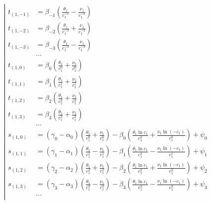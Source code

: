 \begin{equation*} \left| \begin{aligned}
t_{(1,-1)} &=
  \beta_{-1} 
  \left(
  \frac{\theta_1}{c_1^{-1}}
- \frac{\nu_1}{c_1^{-1}}
  \right) \\
%
t_{(1,-2)} &=
  \beta_{-2} 
  \left(
  \frac{\theta_1}{c_1^{-2}}
+ \frac{\nu_1}{c_1^{-2}}
  \right) \\
%
t_{(1,-3)} &=
  \beta_{-3} 
  \left(
  \frac{\theta_1}{c_1^{-3}}
- \frac{\nu_1}{c_1^{-3}}
  \right) \\
%
&\ldots \\
%
t_{(1,0)} &=
  \beta_0
  \left(
  \frac{\theta_1}{c_1^0}
+ \frac{\nu_1}{c_1^0}
  \right) \\
%
t_{(1,1)} &=
  \beta_1
  \left(
  \frac{\theta_1}{c_1^1}
+ \frac{\nu_1}{c_1^1}
  \right) \\
%
t_{(1,2)} &=
  \beta_2
  \left(
  \frac{\theta_1}{c_1^2}
+ \frac{\nu_1}{c_1^2}
  \right) \\
%
t_{(1,3)} &=
  \beta_3
  \left(
  \frac{\theta_1}{c_1^3}
+ \frac{\nu_1}{c_1^3}
  \right) \\
%
&\ldots \\
%
s_{(1,0)} &=
  (\gamma_0 - \alpha_0)
  \left(
  \frac{\theta_1}{c_1^0}
+ \frac{\nu_1}{c_1^0}
  \right)
- \beta_0 
  \left(
  \frac{\theta_1 \ln{c_1}}{c_1^0}
+ \frac{\nu_1 \ln{(- c_1)}}{c_1^0}
  \right)
+ \psi_0 \\
%
s_{(1,1)} &=
  (\gamma_1 - \alpha_1)
  \left(
  \frac{\theta_1}{c_1^1}
- \frac{\nu_1}{c_1^1}
  \right)
- \beta_1 
  \left(
  \frac{\theta_1 \ln{c_1}}{c_1^1}
- \frac{\nu_1 \ln{(- c_1)}}{c_1^1}
  \right)
+ \psi_1 \\
%
s_{(1,2)} &=
  (\gamma_2 - \alpha_2)
  \left(
  \frac{\theta_1}{c_1^2}
+ \frac{\nu_1}{c_1^2}
  \right)
- \beta_2
  \left(
  \frac{\theta_1 \ln{c_1}}{c_1^2}
+ \frac{\nu_1 \ln{(- c_1)}}{c_1^2}
  \right)
+ \psi_2 \\
%
s_{(1,3)} &=
  (\gamma_3 - \alpha_3)
  \left(
  \frac{\theta_1}{c_1^3}
- \frac{\nu_1}{c_1^3}
  \right)
- \beta_3
  \left(
  \frac{\theta_1 \ln{c_1}}{c_1^3}
- \frac{\nu_1 \ln{(- c_1)}}{c_1^3}
  \right)
+ \psi_3 \\
%
&\ldots \\
\end{aligned} \right. \end{equation*}

